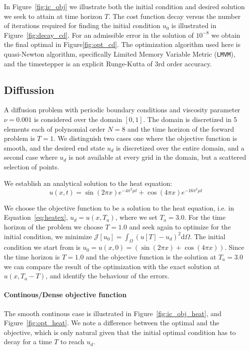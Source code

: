 \documentclass[10pt]{article}
\renewcommand{\d}{\mathrm{d}}
\begin{document}
In Figure~\ref{fig:ic_obj} we illustrate both the initial condition and desired solution we seek to attain at time horizon $T$. The cost function decay versus the number of iterations required for finding the initial condition $u_0$ is illustrated in Figure~\ref{fig:decay_cd}. For an admissible error in the solution of $10^{-8}$ we obtain the final optimal in Figure\ref{fig:opt_cd}. The optimization algorithm used here is quasi-Newton algorithm, specifically Limited Memory Variable Metric (\texttt{LMVM}), and the timestepper is an explicit Runge-Kutta of 3rd order accuracy.


\subsection{Diffussion}

A diffusion problem with periodic boundary conditions and viscosity parameter $\nu=0.001$ is considered over the domain $[0,1]$. The domain is discretized in 5 elements each of polynomial order $N=8$ and the time horizon of the forward problem is $T=1$. We distinguish two cases one where the objective function is smooth, and the desired end state $u_d$ is discretized over the entire domain, and a second case where $u_d$ is not available at every grid in the domain, but a scattered selection of points.

We establish an analytical solution to the heat equation: 
\begin{equation}
u(x,t)=\sin(2\pi x)e^{-4\pi^2\mu t}+\cos(4\pi x)e^{-16\pi^2\mu t}
\label{eq:heatex}
\end{equation}

We choose the objective function to be a solution to the heat equation, i.e. in Equation~\ref{eq:heatex}, $u_d=u(x,T_a)$, where we set $T_a=3.0$. For the time horizon of the problem we choose $T=1.0$ and seek again to optimize for the initial condition, we minimize $\mathcal J[u_0]=\int_{\Omega} (u[T]-u_d)^2 \d \Omega$. The initial condition we start from is $u_0=u(x,0)=(\sin(2\pi x)+\cos(4\pi x))$. Since the time horizon is $T=1.0$ and the objective function is the solution at $T_a=3.0$ we can compare the result of the optimization with the exact solution at $u(x,T_a-T)$, and identify the behaviour of the errors.

\paragraph{Continous/Dense objective function} 
The smooth continous case is illustrated in Figure~\ref{fig:ic_obj_heat}, and Figure~\ref{fig:opt_heat}. We note a difference between the optimal and the objective, which is only natural given that the initial optimal condition has to decay for a time $T$ to reach $u_d$.
\end{document}
